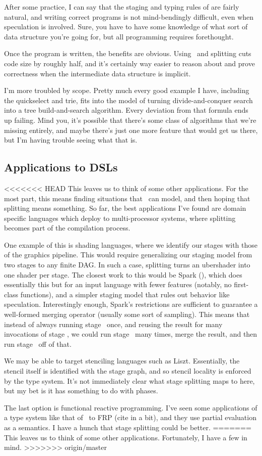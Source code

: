 After some practice, I can say that the staging and typing rules of \lang are fairly natural, 
and writing correct programs is not mind-bendingly difficult, even when speculation is involved.
Sure, you have to have some knowledge of what sort of data structure you're going for,
but all programming requires forethought.

Once the program is written, the benefits are obvious.
Using \lang\ and splitting cuts code size by roughly half,
and it's certainly way easier to reason about and prove correctness when the intermediate data structure is implicit.

I'm more troubled by scope.  
Pretty much every good example I have, including the quickselect and trie, fits into the model of turning
divide-and-conquer search into a tree build-and-search algorithm.  
Every deviation from that formula ends up failing.
Mind you, it's possible that there's some class of algorithms that we're missing entirely, 
and maybe there's just one more feature that would get us there,
but I'm having trouble seeing what that is.

\subsection {Applications to DSLs}

<<<<<<< HEAD
This leaves us to think of some other applications.  
For the most part, this means finding situations that \lang\ can model, and then hoping that splitting means something.
So far, the best applications I've found are domain specific languages which deploy to multi-processor systems,
where splitting becomes part of the compilation process.

One example of this is shading languages,
where we identify our stages with those of the graphics pipeline.
This would require generalizing our staging model from two stages to any finite DAG.
In such a case, splitting turns an ubershader into one shader per stage.
The closest work to this would be Spark (\cite{Foley:2011}), which does essentially this
but for an input language with fewer features (notably, no first-class functions), 
and a simpler staging model that rules out behavior like speculation.
Interestingly enough, Spark's restrictions are sufficient to guarantee a well-formed merging operator 
(usually some sort of sampling).
This means that instead of always running stage \bbone\ once, and reusing the result for many invocations of stage \bbtwo,
we could run stage \bbone\ many times, merge the result, and then run stage \bbtwo\ off of that.

We may be able to target stenciling languages such as Liszt.  
Essentially, the stencil itself is identified with the stage graph, 
and so stencil locality is enforced by the type system.
It's not immediately clear what stage splitting maps to here, but my bet is it has something to do with phases.

The last option is functional reactive programming.
I've seen some applications of a type system like that of \lang\ to FRP (cite in a bit),
and they use partial evaluation as a semantics.
I have a hunch that stage splitting could be better.
=======
This leaves us to think of some other applications.  Fortunately, I have a few in mind.
>>>>>>> origin/master
